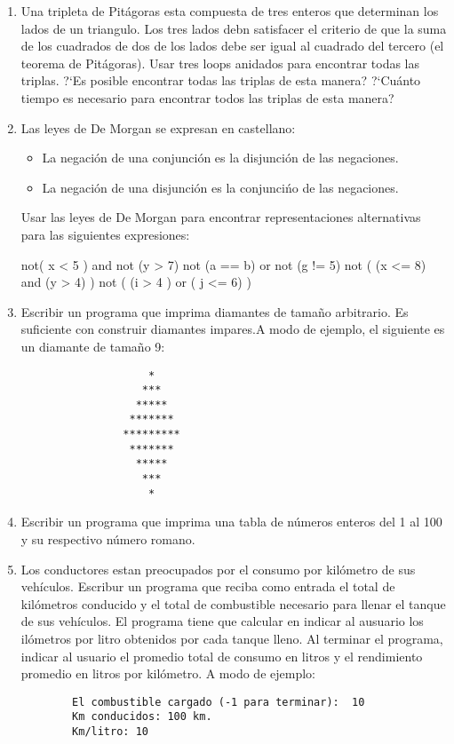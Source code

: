 \documentclass[12pt]{article}
\begin{document}
\begin{enumerate}
        \item Una tripleta de Pit\'agoras esta compuesta de tres enteros que
            determinan los lados de un triangulo. Los tres lados debn
            satisfacer el criterio de que la suma de los cuadrados de dos de
            los lados debe ser igual al cuadrado del tercero (el teorema de
            Pit\'agoras). Usar tres loops anidados para encontrar todas las triplas.
            ?`Es posible encontrar todas las triplas de esta manera?  ?`Cu\'anto tiempo 
            es necesario para encontrar todos las triplas de esta manera?
        \item 
            Las leyes de De Morgan se expresan en castellano:
            \begin{itemize}
                \item La negaci\'on de una conjunci\'on es la disjunci\'on de las negaciones.
                \item La negaci\'on de una disjunci\'on es la conjunci\'no de las negaciones. 
            \end{itemize}
            Usar las leyes de De Morgan para encontrar representaciones alternativas para las siguientes expresiones:
            \begin{python}
                not( x < 5 ) and not (y > 7)
                not (a == b) or not (g != 5)
                not ( (x <= 8) and (y > 4) )
                not ( (i > 4 ) or ( j <= 6) )
            \end{python}

        \item Escribir un programa que imprima diamantes de tama\~no arbitrario. 
           Es suficiente con construir diamantes impares.A modo de ejemplo, el siguiente es un diamante de tama\~no 9:
            \begin{verbatim}
                    *
                   ***
                  *****
                 *******
                *********
                 *******
                  *****
                   ***
                    *
            \end{verbatim}

        \item Escribir un programa que imprima una tabla de n\'umeros enteros del 1 al 100 y su respectivo
            n\'umero romano.

    \item Los conductores estan preocupados por el consumo por kil\'ometro de sus
        veh\'iculos. Escribur un programa que reciba como entrada el total de
        kil\'ometros conducido y el total de combustible necesario para llenar el
        tanque de sus veh\'iculos. El programa tiene que calcular en indicar al
        ausuario los il\'ometros por litro obtenidos por cada tanque lleno. Al terminar
        el programa, indicar al usuario el promedio total de consumo en litros y el
        rendimiento promedio en litros por kil\'ometro.
        A modo de ejemplo:
        \begin{verbatim}
        El combustible cargado (-1 para terminar):  10
        Km conducidos: 100 km.
        Km/litro: 10


\end{verbatim}
\end{enumerate}
\end{document}
